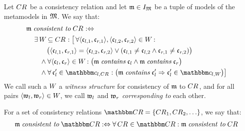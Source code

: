 \begin{definition}[Consistency] \label{def:consistency}
    Let $\consistencyrelation{CR}{}$ be a consistency relation and let $\modeltuple{m} \in \metamodeltupleinstanceset{M}$ be a tuple of models of the metamodels in $\metamodeltuple{M}$.
    We say that:
     \begin{align*}
        & 
        \modeltuple{m} \consistenttomath \consistencyrelation{CR}{} \equivalentperdefinition \\
        & \formulaskip
        \exists \consistencyrelation{W}{} \subseteq \consistencyrelation{CR}{} : 
        \big[
        \forall \tupled{\conditionelement{c}{l,1}, \conditionelement{c}{r,1}}, \tupled{\conditionelement{c}{l,2}, \conditionelement{c}{r,2}} \in \consistencyrelation{W}{} : \\
        & \formulaskip\formulaskip\formulaskip
        \big( \tupled{\conditionelement{c}{l,1}, \conditionelement{c}{r,1}} = \tupled{\conditionelement{c}{l,2}, \conditionelement{c}{r,2}} \lor 
        ( \conditionelement{c}{l,1} \neq \conditionelement{c}{l,2} \land \conditionelement{c}{r,1} \neq \conditionelement{c}{r,2}) \big) \\
        & \formulaskip\formulaskip
        \land \forall \tupled{\conditionelement{c}{l}, \conditionelement{c}{r}} \in \consistencyrelation{W}{} : \big( \modeltuple{m} \containsmath \conditionelement{c}{l} \land \modeltuple{m} \containsmath \conditionelement{c}{r} \big) \\
        & \formulaskip\formulaskip
        \land \forall \conditionelement{c}{l}' \in \condition{c}{l,\consistencyrelation{CR}{}} : \big( \modeltuple{m} \containsmath \conditionelement{c}{l}' \Rightarrow \conditionelement{c}{l}' \in \condition{c}{l,\consistencyrelation{W}{}} \big)
        \big]
    \end{align*}
    We call such a $\consistencyrelation{W}{}$ a \emph{witness structure} for consistency of $\modeltuple{m}$ to $\consistencyrelation{CR}{}$, and for all pairs $\tupled{\conditionelement{w}{l}, \conditionelement{w}{r}} \in \consistencyrelation{W}{}$, we call $\conditionelement{w}{l}$ and $\conditionelement{w}{r}$ \emph{corresponding to} each other.
    
    For a set of consistency relations $\consistencyrelationset{CR} = \setted{\consistencyrelation{CR}{1}, \consistencyrelation{CR}{2}, \dots}$, we say that:
    \begin{align*}
        \formulaskip &
        \modeltuple{m} \consistenttomath \consistencyrelationset{CR} \equivalentperdefinition
        \forall \consistencyrelation{CR}{} \in \consistencyrelationset{CR} : \modeltuple{m} \consistenttomath \consistencyrelation{CR}{}
    \end{align*}
\end{definition}

